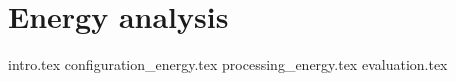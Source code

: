 \chapter{Energy analysis}
\label{ch:6}
{intro.tex}
{configuration_energy.tex}
{processing_energy.tex}
{evaluation.tex}